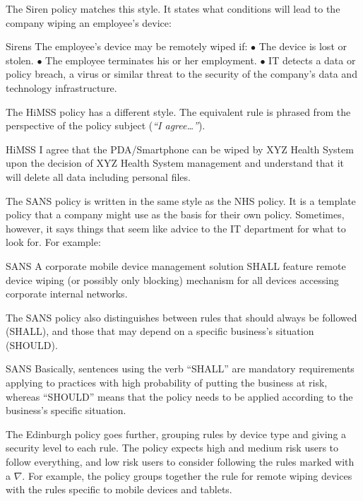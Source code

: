 \documentclass[thesis.tex]{subfiles}
\begin{document}
The Siren policy matches this style. It states what conditions will lead to the
company wiping an employee's device:

\begin{policyrule}{Sirens}
The employee's device may be remotely wiped if: $\bullet$ The device is lost or
stolen. $\bullet$ The employee terminates his or her employment. $\bullet$ IT
detects a data or policy breach, a virus or similar threat to the security of
the company's data and technology infrastructure.
\end{policyrule}

The \ac{HiMSS} policy has a different style.
The equivalent rule is phrased from the perspective of the policy subject
(\emph{``I agree\dots''}).

\begin{policyrule}{HiMSS}
  I agree that the PDA/Smartphone can be wiped by XYZ Health System upon the
  decision of XYZ Health System management and understand that it will delete all
  data including personal files.
\end{policyrule}

The SANS policy is written in the same style as the NHS policy.  It is
a template policy that a company might use as the basis for their
own policy. Sometimes, however, it says things that seem like advice to the IT
department for what to look for.  For example:

\begin{policyrule}{SANS}
   A corporate mobile device management solution SHALL feature remote device
   wiping (or possibly only blocking) mechanism for all devices accessing
   corporate internal networks.
\end{policyrule}

The SANS policy also distinguishes between rules that should always be followed (SHALL),
and those that may depend on a specific business's situation (SHOULD).

\begin{policyrule}{SANS}
  Basically, sentences using the verb ``SHALL'' are mandatory requirements
  applying to practices with high probability of putting the business at risk,
  whereas ``SHOULD'' means that the policy needs to be applied according to the
  business's specific situation.
\end{policyrule}

The Edinburgh policy goes further, grouping rules by device type and
giving a security level to each rule.  The policy expects high and
medium risk users to follow everything, and low risk users to consider
following the rules marked with a $\nabla$.  For example, the policy
groups together the rule for remote wiping devices with the rules
specific to mobile devices and tablets.
\end{document}
